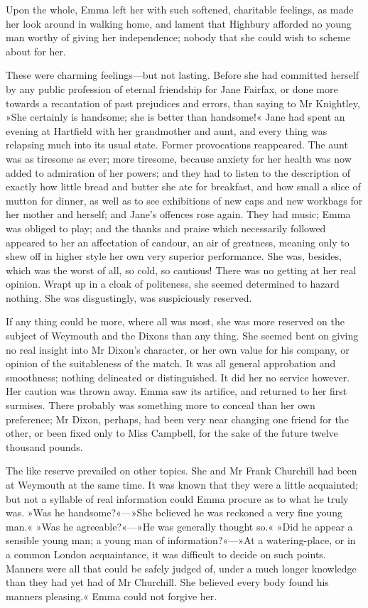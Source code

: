 Upon the whole, Emma left her with such softened, charitable feelings, as made her look around in walking home, and lament that Highbury afforded no young man worthy of giving her independence; nobody that she could wish to scheme about for her.

These were charming feelings—but not lasting. Before she had committed herself by any public profession of eternal friendship for Jane Fairfax, or done more towards a recantation of past prejudices and errors, than saying to Mr Knightley, »She certainly is handsome; she is better than handsome!« Jane had spent an evening at Hartfield with her grandmother and aunt, and every thing was relapsing much into its usual state. Former provocations reappeared. The aunt was as tiresome as ever; more tiresome, because anxiety for her health was now added to admiration of her powers; and they had to listen to the description of exactly how little bread and butter she ate for breakfast, and how small a slice of mutton for dinner, as well as to see exhibitions of new caps and new workbags for her mother and herself; and Jane's offences rose again. They had music; Emma was obliged to play; and the thanks and praise which necessarily followed appeared to her an affectation of candour, an air of greatness, meaning only to shew off in higher style her own very superior performance. She was, besides, which was the worst of all, so cold, so cautious! There was no getting at her real opinion. Wrapt up in a cloak of politeness, she seemed determined to hazard nothing. She was disgustingly, was suspiciously reserved.

If any thing could be more, where all was most, she was more reserved on the subject of Weymouth and the Dixons than any thing. She seemed bent on giving no real insight into Mr Dixon's character, or her own value for his company, or opinion of the suitableness of the match. It was all general approbation and smoothness; nothing delineated or distinguished. It did her no service however. Her caution was thrown away. Emma saw its artifice, and returned to her first surmises. There probably was something more to conceal than her own preference; Mr Dixon, perhaps, had been very near changing one friend for the other, or been fixed only to Miss Campbell, for the sake of the future twelve thousand pounds.

The like reserve prevailed on other topics. She and Mr Frank Churchill had been at Weymouth at the same time. It was known that they were a little acquainted; but not a syllable of real information could Emma procure as to what he truly was. »Was he handsome?«—»She believed he was reckoned a very fine young man.« »Was he agreeable?«—»He was generally thought so.« »Did he appear a sensible young man; a young man of information?«—»At a watering-place, or in a common London acquaintance, it was difficult to decide on such points. Manners were all that could be safely judged of, under a much longer knowledge than they had yet had of Mr Churchill. She believed every body found his manners pleasing.« Emma could not forgive her.